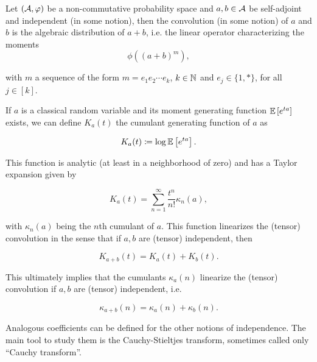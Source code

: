     \begin{definition}
        Let $(\mathcal A,\varphi)$ be a non-commutative probability space and $a,b\in\mathcal A$ be {\color{red} self-adjoint and} independent (in some notion), then the convolution (in some notion) of $a$ and $b$ is the algebraic distribution of $a+b$, i.e. the linear operator characterizing the moments
        \begin{equation*}
            \phi\left((a+b)^{m}\right),
        \end{equation*}

        \noindent with $m$ a sequence of the form $m = e_1 e_2 \cdots e_k$, $k\in \mathbb N$ and $e_j \in \{1,*\}$, for all $j \in [k]$.
    \end{definition}

    If $a$ is a classical random variable and its moment generating function $\mathbb E \left[ e^{ta} \right]$ exists, we can define $K_a(t)$ the cumulant generating function of $a$ as

    \begin{equation*}
        K_a(t) \coloneqq \log \mathbb E \left[  e^{ta}  \right].
    \end{equation*}

    This function is analytic (at least in a neighborhood of zero) and has a Taylor expansion given by

    \begin{equation*}
        K_a(t) =  \sum_{n=1}^\infty \frac{t^n}{n!} \kappa_n(a),
    \end{equation*}

    \noindent with $\kappa_n(a)$ being the $n$th cumulant of $a$. This function linearizes the (tensor) convolution in the sense that if $a,b$ are (tensor) independent, then

    \begin{equation*}
        K_{a+b}(t) = K_a(t)+K_b(t).
    \end{equation*}

    This ultimately implies that the cumulants $\kappa_a(n)$ linearize the (tensor) convolution if $a,b$ are (tensor) independent, i.e.

    \begin{equation*}
        \kappa_{a+b}(n) = \kappa_a(n) + \kappa_b(n).
    \end{equation*}

    Analogous coefficients can be defined for the other notions of independence. The main tool to study them is the Cauchy-Stieltjes transform, sometimes called only ``Cauchy transform''.

